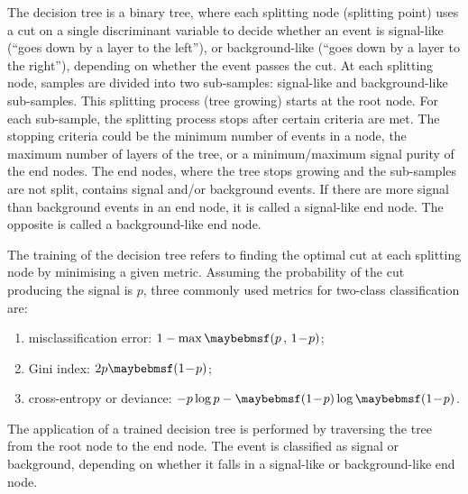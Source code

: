 The decision tree is a binary tree, where each splitting node (splitting point) uses a cut on a single discriminant variable to decide whether an event is signal-like (``goes down by a layer to the left''), or background-like (``goes down by a layer to the right''), depending on whether the event passes the cut. At each splitting node, samples are divided into two sub-samples: signal-like and background-like sub-samples. This splitting process (tree growing) starts at the  root node. For each sub-sample, the splitting process stops after certain criteria are met. The stopping criteria could be the minimum number of events in a node, the maximum number of layers of the tree, or a minimum/maximum signal purity of the end nodes.  The end nodes, where the tree stops growing and the sub-samples are not split, contains signal and/or background events. If there are more signal than background events in an end node, it is called a signal-like end node. The opposite is called a background-like end node.



The training of the decision tree refers to finding the optimal cut at each splitting node by minimising a given metric. Assuming the probability of the cut producing the signal is $p$, three commonly used metrics for two-class classification are:
\begin{enumerate}
\item misclassification error:  $1 - \max\parenths{p\,,\,1\!-\!p}$;
\item Gini index: $2p\parenths{1\!-\!p}$;
\item cross-entropy or deviance: $-p\log{p}-\parenths{1\!-\!p}\log\parenths{1\!-\!p}$.
\end{enumerate}

The application of a trained decision tree is performed by traversing the tree from the root node to the end node. The event is classified as signal or background, depending on whether it falls in a signal-like or background-like end node.



